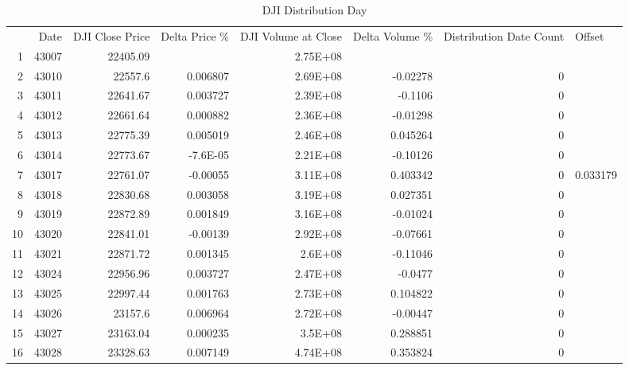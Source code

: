 \documentclass{article}
\begin{document}
\begin{table}[htbp]
  \caption{DJI Distribution Day}
    \begin{tabular}{rrrrrlrr}
          & \multicolumn{1}{p{4.215em}}{Date} & \multicolumn{1}{p{4.215em}}{DJI Close Price} & \multicolumn{1}{p{4.215em}}{Delta Price \%} & \multicolumn{1}{p{4.215em}}{DJI  Volume at Close} & \multicolumn{1}{p{4.215em}}{Delta Volume \%} & \multicolumn{1}{p{4.215em}}{Distribution Date Count} & \multicolumn{1}{l}{Offset} \\
    1     & 43007 & 22405.09 &       & 2.75E+08 &       &       &  \\
    2     & 43010 & 22557.6 & 0.006807 & 2.69E+08 & \multicolumn{1}{r}{-0.02278} & 0     &  \\
    3     & 43011 & 22641.67 & 0.003727 & 2.39E+08 & \multicolumn{1}{r}{-0.1106} & 0     &  \\
    4     & 43012 & 22661.64 & 0.000882 & 2.36E+08 & \multicolumn{1}{r}{-0.01298} & 0     &  \\
    5     & 43013 & 22775.39 & 0.005019 & 2.46E+08 & \multicolumn{1}{r}{0.045264} & 0     &  \\
    6     & 43014 & 22773.67 & -7.6E-05 & 2.21E+08 & \multicolumn{1}{r}{-0.10126} & 0     &  \\
    7     & 43017 & 22761.07 & -0.00055 & 3.11E+08 & \multicolumn{1}{r}{0.403342} & 0     & 0.033179 \\
    8     & 43018 & 22830.68 & 0.003058 & 3.19E+08 & \multicolumn{1}{r}{0.027351} & 0     &  \\
    9     & 43019 & 22872.89 & 0.001849 & 3.16E+08 & \multicolumn{1}{r}{-0.01024} & 0     &  \\
    10    & 43020 & 22841.01 & -0.00139 & 2.92E+08 & \multicolumn{1}{r}{-0.07661} & 0     &  \\
    11    & 43021 & 22871.72 & 0.001345 & 2.6E+08 & \multicolumn{1}{r}{-0.11046} & 0     &  \\
    12    & 43024 & 22956.96 & 0.003727 & 2.47E+08 & \multicolumn{1}{r}{-0.0477} & 0     &  \\
    13    & 43025 & 22997.44 & 0.001763 & 2.73E+08 & \multicolumn{1}{r}{0.104822} & 0     &  \\
    14    & 43026 & 23157.6 & 0.006964 & 2.72E+08 & \multicolumn{1}{r}{-0.00447} & 0     &  \\
    15    & 43027 & 23163.04 & 0.000235 & 3.5E+08 & \multicolumn{1}{r}{0.288851} & 0     &  \\
    16    & 43028 & 23328.63 & 0.007149 & 4.74E+08 & \multicolumn{1}{r}{0.353824} & 0     &  \\

\end{tabular}
\end{table}
\end{document}
